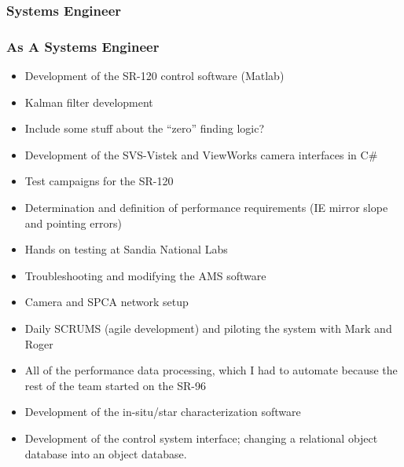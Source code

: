 \documentclass[aspectratio=169]{beamer}
\begin{document}
\subsubsection{Systems Engineer}
\begin{frame}
  \frametitle{As A Systems Engineer}
  \begin{itemize}
  \item Development of the SR-120 control software (Matlab)
  \item Kalman filter development
  \item Include some stuff about the ``zero'' finding logic?
  \item Development of the SVS-Vistek and ViewWorks camera interfaces
    in C\#
  \item Test campaigns for the SR-120
  \item Determination and definition of performance requirements (IE
    mirror slope and pointing errors)
  \item Hands on testing at Sandia National Labs
  \item Troubleshooting and modifying the AMS software
  \item Camera and SPCA network setup
  \item Daily SCRUMS (agile development) and piloting the system with
    Mark and Roger
  \item All of the performance data processing, which I had to
    automate because the rest of the team started on the SR-96
  \item Development of the in-situ/star characterization software
  \item Development of the control system interface; changing a
    relational object database into an object database.
  \end{itemize}
\end{frame}
\end{document}
